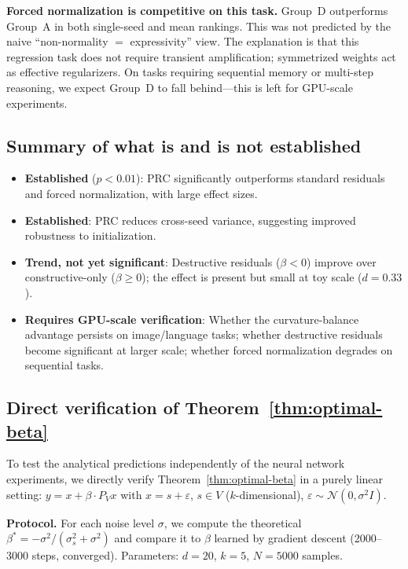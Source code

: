 \documentclass[11pt,a4paper]{article}
\theoremstyle{definition}
\begin{document}
\textbf{Forced normalization is competitive on this task.}
Group~D outperforms Group~A in both single-seed and mean rankings. This was
not predicted by the naive ``non-normality $=$ expressivity'' view. The
explanation is that this regression task does not require transient
amplification; symmetrized weights act as effective regularizers. On tasks
requiring sequential memory or multi-step reasoning, we expect Group~D
to fall behind---this is left for GPU-scale experiments.

\subsection{Summary of what is and is not established}

\begin{itemize}[nosep]
  \item \textbf{Established} ($p < 0.01$): PRC significantly outperforms
        standard residuals and forced normalization, with large effect sizes.
  \item \textbf{Established}: PRC reduces cross-seed variance, suggesting
        improved robustness to initialization.
  \item \textbf{Trend, not yet significant}: Destructive residuals ($\beta < 0$)
        improve over constructive-only ($\beta \geq 0$); the effect is
        present but small at toy scale ($d = 0.33$).
  \item \textbf{Requires GPU-scale verification}: Whether the curvature-balance
        advantage persists on image/language tasks; whether destructive residuals
        become significant at larger scale; whether forced normalization
        degrades on sequential tasks.
\end{itemize}

\subsection{Direct verification of Theorem~\ref{thm:optimal-beta}}

To test the analytical predictions independently of the neural network
experiments, we directly verify Theorem~\ref{thm:optimal-beta} in a
purely linear setting: $y = x + \beta \cdot P_V x$ with
$x = s + \varepsilon$, $s \in V$ ($k$-dimensional), $\varepsilon \sim
\mathcal{N}(0, \sigma^2 I)$.

\textbf{Protocol.} For each noise level $\sigma$, we compute the
theoretical $\beta^* = -\sigma^2/(\sigma_s^2 + \sigma^2)$ and compare
it to $\beta$ learned by gradient descent (2000--3000 steps, converged).
Parameters: $d = 20$, $k = 5$, $N = 5000$ samples.
\end{document}

